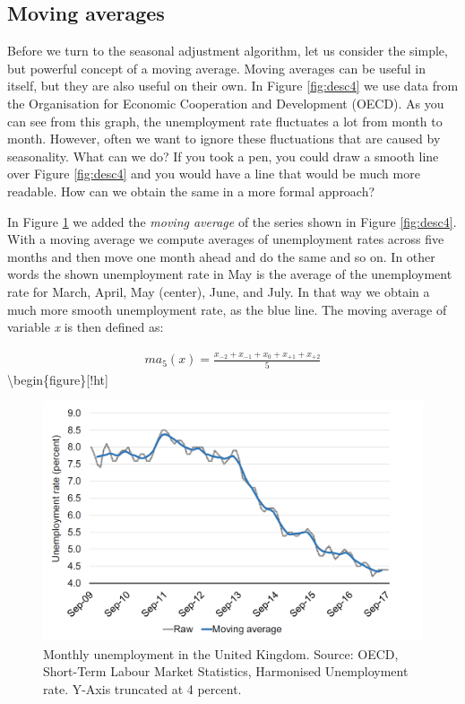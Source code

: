 \documentclass[]{book}
\begin{document}
\hypertarget{moving-averages}{%
\subsection{Moving averages}\label{moving-averages}}

Before we turn to the seasonal adjustment algorithm, let us consider the simple, but powerful concept of a moving average. Moving averages can be useful in itself, but they are also useful on their own. In Figure \ref{fig:desc4} we use data from the Organisation for Economic Cooperation and Development (OECD). As you can see from this graph, the unemployment rate fluctuates a lot from month to month. However, often we want to ignore these fluctuations that are caused by seasonality. What can we do? If you took a pen, you could draw a smooth line over Figure \ref{fig:desc4} and you would have a line that would be much more readable. How can we obtain the same in a more formal approach?

In Figure \ref{fig:desc5} we added the \emph{moving average} of the series shown in Figure \ref{fig:desc4}. With a moving average we compute averages of unemployment rates across five months and then move one month ahead and do the same and so on. In other words the shown unemployment rate in May is the average of the unemployment rate for March, April, May (center), June, and July. In that way we obtain a much more smooth unemployment rate, as the blue line. The moving average of variable \emph{x} is then defined as:

\begin{align}
    ma_{5}(x)=\frac{x_{-2}+x_{-1}+x_{0}+x_{+1}+x_{+2}}{5}
  \end{align}
\textbackslash begin\{figure\}{[}!ht{]}

\begin{figure}

{\centering \includegraphics[width=0.9\linewidth]{_resources/chapter_describe/ex2_2} 

}

\caption{Monthly unemployment in the United Kingdom. Source: OECD, Short-Term Labour Market Statistics, Harmonised Unemployment rate.  Y-Axis truncated at 4 percent.}\label{fig:desc5}
\end{figure}
\end{document}
